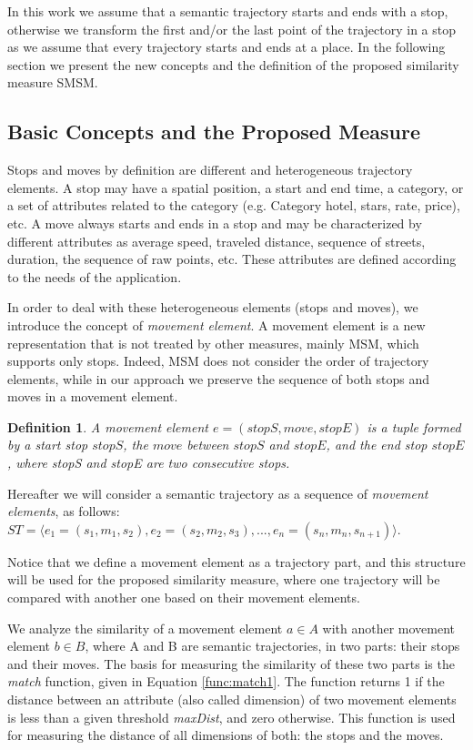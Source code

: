 \documentclass[12pt]{article}
\newtheorem{definition}{Definition}
\begin{document}
In this work we assume that a semantic trajectory starts and ends with a stop, otherwise we transform the first and/or the last point of the trajectory in a stop {as we assume that every trajectory starts and ends at a place}. In the following section we present the new concepts and the definition of the proposed similarity measure SMSM.

\subsection{Basic Concepts and the Proposed Measure}

Stops and moves by definition are different and heterogeneous trajectory elements. A stop may have a spatial position, a start and end time, a category, or a set of attributes related to the category (e.g. Category hotel, stars, rate, price), etc. A move always starts and ends in a stop and may be characterized by different attributes as average speed, traveled distance, sequence of streets, duration, the sequence of raw points, etc. These attributes are defined according to the needs of the application. 

In order to deal with these heterogeneous elements (stops and moves), we introduce the concept of \emph{movement element}. A movement element is a new representation that is not treated by other measures, mainly MSM, which supports only stops. Indeed, MSM does not consider the order of trajectory elements, while in our approach we preserve the sequence of both stops and moves in a movement element.

\begin{definition}
\label{def:movement_element}
A movement element  $e=(stopS, move, stopE)$ is a tuple formed by a start stop $stopS$, the $move$ between $stopS$ and  $stopE$, and the end stop $stopE$, where stopS and stopE are two consecutive stops.
\end{definition}


Hereafter we will consider a semantic trajectory as a sequence of \textit{movement elements}, as follows: 
$ST=\langle e_1=(s_1,m_1,s_2), e_2=(s_2,m_2,s_3), ..., e_n=(s_n,m_n,s_{n+1}) \rangle$.

Notice that we define a movement element as a trajectory part, and this structure will be used for the proposed similarity measure, where one trajectory will be compared with another one based on their movement elements.



We analyze the similarity of a movement element $a\in A$ with another movement element $b\in B$, where A and B are semantic trajectories, in two parts: their stops and their moves. The basis for measuring the similarity of these two parts is the \emph{match} function, given in Equation \ref{func:match1}. The function returns 1 if the distance between an attribute (also called dimension) of two movement elements is less than a given threshold \emph{maxDist}, and zero otherwise. This function is used for measuring the distance of all dimensions of both: the stops and the moves.
\end{document}
